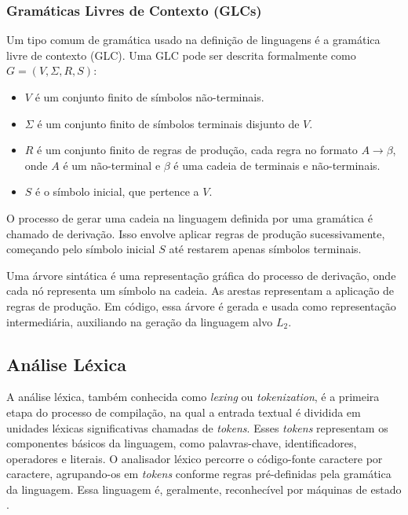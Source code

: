\documentclass[english,
               brazil,
               bsc] %
               {dcomp-abntex2}
\begin{document}
\subsubsection{Gramáticas Livres de Contexto (GLCs)}


Um tipo comum de gramática usado na definição de linguagens é a gramática livre de contexto (GLC).  Uma GLC pode ser descrita formalmente como $ G=(V,\Sigma,R,S)$:


\begin{itemize}
  \item $V$ é um conjunto finito de símbolos não-terminais.


  \item $\Sigma$ é um conjunto finito de símbolos terminais disjunto de $V$.


  \item $R$ é um conjunto finito de regras de produção, cada regra no formato $A \rightarrow \beta$, onde $A$ é um não-terminal e $\beta$ é uma cadeia de terminais e não-terminais.


  \item $S$ é o símbolo inicial, que pertence a $V$.
\end{itemize}


O processo de gerar uma cadeia na linguagem definida por uma gramática é chamado de derivação. Isso envolve aplicar regras de produção sucessivamente, começando pelo símbolo inicial $S$ até restarem apenas símbolos terminais.


Uma árvore sintática é uma representação gráfica do processo de derivação, onde cada nó representa um símbolo na cadeia. As arestas representam a aplicação de regras de produção. Em código, essa árvore é gerada e usada como representação intermediária,  auxiliando na geração da linguagem alvo $L_2$.




\subsection{Análise Léxica}
A análise léxica, também conhecida como \textit{lexing} ou \textit{tokenization}, é a primeira etapa do processo de compilação, na qual a entrada textual é dividida em unidades léxicas significativas chamadas de \textit{tokens}. Esses \textit{tokens} representam os componentes básicos da linguagem, como palavras-chave, identificadores, operadores e literais. O analisador léxico percorre o código-fonte caractere por caractere, agrupando-os em \textit{tokens} conforme regras pré-definidas pela gramática da linguagem. Essa linguagem é, geralmente, reconhecível por máquinas de estado \cite{automata}.
\end{document}
